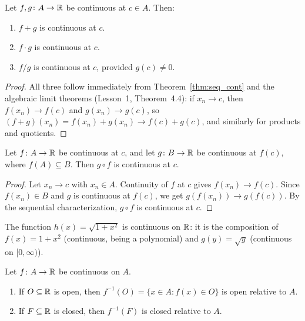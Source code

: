 \documentclass[11pt,a4paper]{article}
\begin{document}
\begin{theorem}
\label{thm:cont_algebra}
Let $f, g \colon A \to \mathbb{R}$ be continuous at $c \in A$. Then:
\begin{enumerate}[nosep,label=(\roman*)]
  \item $f + g$ is continuous at $c$.
  \item $f \cdot g$ is continuous at $c$.
  \item $f / g$ is continuous at $c$, provided $g(c) \neq 0$.
\end{enumerate}
\end{theorem}

\begin{proof}
All three follow immediately from Theorem~\ref{thm:seq_cont} and the
algebraic limit theorems (Lesson~1, Theorem~4.4): if $x_n \to c$, then
$f(x_n) \to f(c)$ and $g(x_n) \to g(c)$, so
$(f + g)(x_n) = f(x_n) + g(x_n) \to f(c) + g(c)$, and similarly for
products and quotients.
\end{proof}

\begin{theorem}
\label{thm:cont_composition}
Let $f \colon A \to \mathbb{R}$ be continuous at $c$, and let $g \colon B \to \mathbb{R}$
be continuous at $f(c)$, where $f(A) \subseteq B$. Then $g \circ f$ is
continuous at $c$.
\end{theorem}

\begin{proof}
Let $x_n \to c$ with $x_n \in A$. Continuity of $f$ at $c$ gives
$f(x_n) \to f(c)$. Since $f(x_n) \in B$ and $g$ is continuous at $f(c)$,
we get $g(f(x_n)) \to g(f(c))$. By the sequential characterization,
$g \circ f$ is continuous at $c$.
\end{proof}

\begin{example}
\label{ex:cont_composition}
The function $h(x) = \sqrt{1 + x^2}$ is continuous on $\mathbb{R}$: it is the
composition of $f(x) = 1 + x^2$ (continuous, being a polynomial) and
$g(y) = \sqrt{y}$ (continuous on $[0, \infty)$).
\end{example}

\begin{theorem}
\label{thm:cont_preimage}
Let $f \colon A \to \mathbb{R}$ be continuous on $A$.
\begin{enumerate}[nosep,label=(\roman*)]
  \item If $O \subseteq \mathbb{R}$ is open, then
    $f^{-1}(O) = \{x \in A : f(x) \in O\}$ is open relative to $A$.
  \item If $F \subseteq \mathbb{R}$ is closed, then $f^{-1}(F)$ is closed
    relative to $A$.
\end{enumerate}
\end{theorem}
\end{document}

